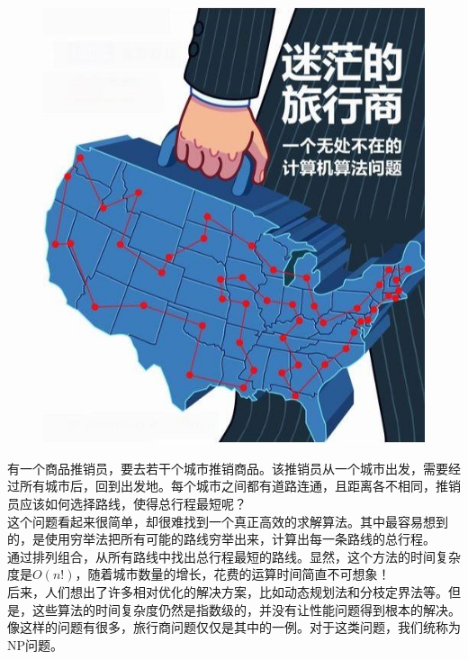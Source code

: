 \begin{figure}[H]
	\centering
	\includegraphics[scale=0.4]{img/C11/11-5/1.png}
\end{figure}

有一个商品推销员，要去若干个城市推销商品。该推销员从一个城市出发，需要经过所有城市后，回到出发地。每个城市之间都有道路连通，且距离各不相同，推销员应该如何选择路线，使得总行程最短呢？\\

这个问题看起来很简单，却很难找到一个真正高效的求解算法。其中最容易想到的，是使用穷举法把所有可能的路线穷举出来，计算出每一条路线的总行程。\\

通过排列组合，从所有路线中找出总行程最短的路线。显然，这个方法的时间复杂度是$ O(n!) $，随着城市数量的增长，花费的运算时间简直不可想象！\\

后来，人们想出了许多相对优化的解决方案，比如动态规划法和分枝定界法等。但是，这些算法的时间复杂度仍然是指数级的，并没有让性能问题得到根本的解决。\\

像这样的问题有很多，旅行商问题仅仅是其中的一例。对于这类问题，我们统称为NP问题。

